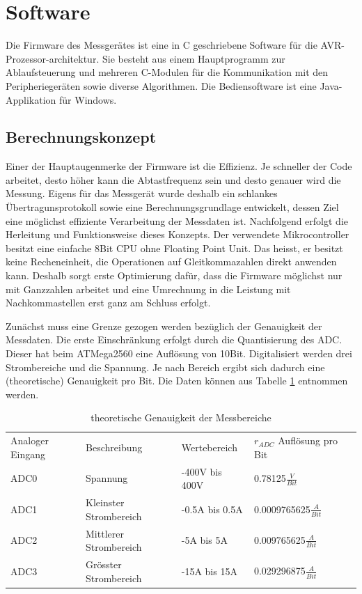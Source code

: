 \section{Software}
Die Firmware des Messgerätes ist eine in C geschriebene Software für die AVR-Prozessor-architektur. Sie besteht aus einem Hauptprogramm zur Ablaufsteuerung und mehreren C-Modulen für die Kommunikation mit den Peripheriegeräten sowie diverse Algorithmen. Die Bediensoftware ist eine Java-Applikation für Windows.

\subsection{Berechnungskonzept}
Einer der Hauptaugenmerke der Firmware ist die Effizienz. Je schneller der Code arbeitet, desto höher kann die Abtastfrequenz sein und desto genauer wird die Messung. Eigens für das Messgerät wurde deshalb ein schlankes Übertragunsprotokoll sowie eine Berechnungsgrundlage entwickelt, dessen Ziel eine möglichst effiziente Verarbeitung der Messdaten ist. Nachfolgend erfolgt die Herleitung und Funktionsweise dieses Konzepts.
Der verwendete Mikrocontroller besitzt eine einfache 8Bit CPU ohne Floating Point Unit. Das heisst, er besitzt keine Recheneinheit, die Operationen auf Gleitkommazahlen direkt anwenden kann. Deshalb sorgt erste Optimierung dafür, dass die Firmware möglichst nur mit Ganzzahlen arbeitet und eine Umrechnung in die Leistung mit Nachkommastellen erst ganz am Schluss erfolgt.

Zunächst muss eine Grenze gezogen werden bezüglich der Genauigkeit der Messdaten. Die erste Einschränkung erfolgt durch die Quantisierung des ADC. Dieser hat beim ATMega2560 eine Auflösung von 10Bit. Digitalisiert werden drei Strombereiche und die Spannung. Je nach Bereich ergibt sich dadurch eine (theoretische) Genauigkeit pro Bit. Die Daten können aus Tabelle \ref{tab:theoretische_Genauigkeit_der_Messbereiche} entnommen werden.


\begin{table}[H]
\begin{center}
\begin{tabular}{|l|l|l|l|l}
\cline{1-4}
Analoger Eingang & Beschreibung           & Wertebereich   & $r_{ADC}$ Auflösung pro Bit &  \\ \cline{1-4}
ADC0             & Spannung               & -400V bis 400V & 0.78125$\frac{V}{Bit}$      &  \\ \cline{1-4}
ADC1             & Kleinster Strombereich & -0.5A bis 0.5A & 0.0009765625$\frac{A}{Bit}$ &  \\ \cline{1-4}
ADC2             & Mittlerer Strombereich & -5A bis 5A     & 0.009765625$\frac{A}{Bit}$  &  \\ \cline{1-4}
ADC3             & Grösster Strombereich  & -15A bis 15A   & 0.029296875$\frac{A}{Bit}$  &  \\ \cline{1-4}
\end{tabular}
\caption{theoretische Genauigkeit der Messbereiche}
\label{tab:theoretische_Genauigkeit_der_Messbereiche}
\end{center}
\end{table}


